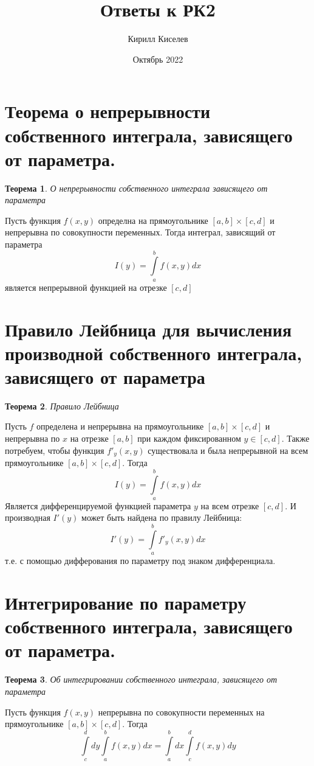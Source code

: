 \documentclass[12pt, a4paper]{article}
\title{Ответы к РК2}
\author{Кирилл Киселев}
\date{Октябрь 2022}
\newtheorem{thm}{Теорема}
\begin{document}
\maketitle
\newpage

\section{Теорема о непрерывности собственного интеграла, зависящего от параметра.}
\begin{thm}
О непрерывности собственного интеграла зависящего от параметра
\end{thm}
Пусть функция $f(x, y)$ определна на прямоугольнике $[a, b] \times [c, d]$ и непрерывна по совокупности переменных.
Тогда интеграл, зависящий от параметра
    \[
        I(y) = \int\limits_a^b f(x, y)dx
    \]
является непрерывной функцией на отрезке $[c, d]$

\section{Правило Лейбница для вычисления производной собственного интеграла, зависящего от параметра}
\begin{thm}
    Правило Лейбница
\end{thm}
Пусть $f$ определена и непрерывна на прямоугольнике $[a, b] \times [c, d]$ и
непрерывна по $x$ на отрезке $[a, b]$ при каждом фиксированном $y \in [c, d]$.
Также потребуем, чтобы функция $f'_y(x, y)$ существовала и была непрерывной на
всем прямоугольнике $[a, b] \times [c, d]$. Тогда
\[
    I(y) = \int\limits_a^b f(x, y)dx
\]
Является дифференцируемой функцией параметра $y$ на всем отрезке $[c, d]$.
И производная $I'(y)$ может быть найдена по правилу Лейбница:
\[
    I'(y) = \int\limits_a^b f'_y(x, y)dx
\]
т.е. с помощью дифферования по параметру под знаком дифференциала.

\section{Интегрирование по параметру собственного интеграла, зависящего от параметра.}
\begin{thm}
    Об интегрировании собственного интеграла, зависящего от параметра
\end{thm}
Пусть функция $f(x, y)$ непрерывна по совокупности переменных на прямоугольнике 
$[a, b] \times [c, d]$. Тогда
\[
    \int\limits_c^d dy \int\limits_a^b f(x, y)dx = \int\limits_a^b dx \int\limits_c^d f(x, y)dy  
    \]
\end{document}
